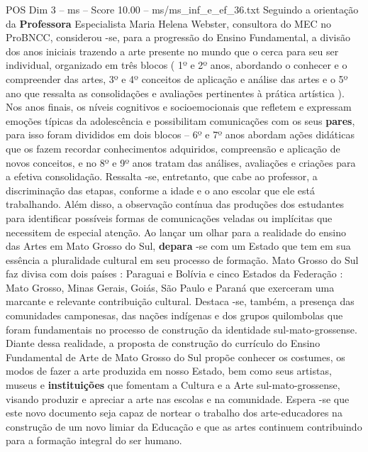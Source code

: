 \begin{textsample}{POS Dim 3 – ms – Score 10.00 – ms/ms\_inf\_e\_ef\_36.txt}
Seguindo a orientação da \textbf{Professora} Especialista Maria Helena Webster, consultora do MEC no ProBNCC, considerou -se, para a progressão do Ensino Fundamental, a divisão dos anos iniciais trazendo a arte presente no mundo que o cerca para seu ser individual, organizado em três blocos ( 1º e 2º anos, abordando o conhecer e o compreender das artes, 3º e 4º conceitos de aplicação e análise das artes e o 5º ano que ressalta as consolidações e avaliações pertinentes à prática artística ).
Nos anos finais, os níveis cognitivos e socioemocionais que refletem e expressam emoções típicas da adolescência e possibilitam comunicações com os seus \textbf{pares}, para isso foram divididos em dois blocos – 6º e 7º anos abordam ações didáticas que os fazem recordar conhecimentos adquiridos, compreensão e aplicação de novos conceitos, e no 8º e 9º anos tratam das análises, avaliações e criações para a efetiva consolidação.
Ressalta -se, entretanto, que cabe ao professor, a discriminação das etapas, conforme a idade e o ano escolar que ele está trabalhando.
Além disso, a observação contínua das produções dos estudantes para identificar possíveis formas de comunicações veladas ou implícitas que necessitem de especial atenção.
Ao lançar um olhar para a realidade do ensino das Artes em Mato Grosso do Sul, \textbf{depara} -se com um Estado que tem em sua essência a pluralidade cultural em seu processo de formação.
Mato Grosso do Sul faz divisa com dois países : Paraguai e Bolívia e cinco Estados da Federação : Mato Grosso, Minas Gerais, Goiás, São Paulo e Paraná que exerceram uma marcante e relevante contribuição cultural.
Destaca -se, também, a presença das comunidades camponesas, das nações indígenas e dos grupos quilombolas que foram fundamentais no processo de construção da identidade sul-mato-grossense.
Diante dessa realidade, a proposta de construção do currículo do Ensino Fundamental de Arte de Mato Grosso do Sul propõe conhecer os costumes, os modos de fazer a arte produzida em nosso Estado, bem como seus artistas, museus e \textbf{instituições} que fomentam a Cultura e a Arte sul-mato-grossense, visando produzir e apreciar a arte nas escolas e na comunidade.
Espera -se que este novo documento seja capaz de nortear o trabalho dos arte-educadores na construção de um novo limiar da Educação e que as artes continuem contribuindo para a formação integral do ser humano.

\end{textsample}
